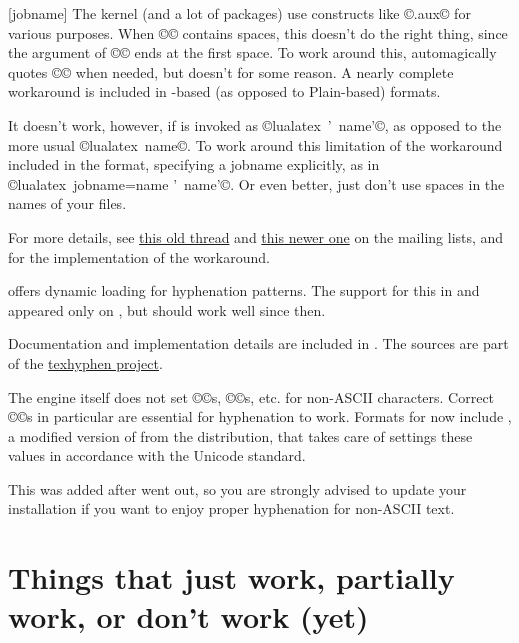 \documentclass{lltxdoc}
\begin{document}
[jobname]
The \latex kernel (and a lot of packages) use constructs like
©\jobname.aux© for various purposes. When ©\jobname© contains spaces,
this doesn't do the right thing, since the argument of ©© ends at the
first space. To work around this, \pdftex automagically quotes ©\jobname© when
needed, but \luatex doesn't for some reason. A nearly complete workaround is
included in \latex-based (as opposed to Plain-based) \luatex formats.

It doesn't work, however, if \luatex is invoked as ©lualatex ' name'©,
as opposed to the more usual ©lualatex name©. To work around this
limitation of the workaround included in the format, specifying a jobname
explicitly, as in ©lualatex jobname=name ' name'©. Or even better, just
don't use spaces in the names of your \tex files.

For more details, see
\href{http://www.ntg.nl/pipermail/dev-luatex/2009-April/002549.html}{this old
  thread} and
\href{http://tug.org/pipermail/luatex/2010-August/001986.html}{this newer one}
on the \luatex mailing lists, and  for the
implementation of the workaround.

\luatex offers dynamic loading for hyphenation patterns. The support for this in
 and  appeared only on , but should
work well since then.

Documentation and implementation details are included in
. The sources are part of the
\href{http://tug.org/tex-hyphen/}{texhyphen project}.

The engine itself does not set ©\catcode©s, ©\lccode©s, etc. for non-ASCII
characters. Correct ©\lccode©s in particular are essential for hyphenation to
work. Formats for \luatex now include , a
modified version of  from the \xetex distribution,
that takes care of settings these values in accordance with the Unicode
standard.

This was added after  went out, so you are strongly advised to
update your installation if you want to enjoy proper hyphenation for non-ASCII
text.


\section{Things that just work, partially work, or don't work (yet)}
\label{workornot}
\end{document}
